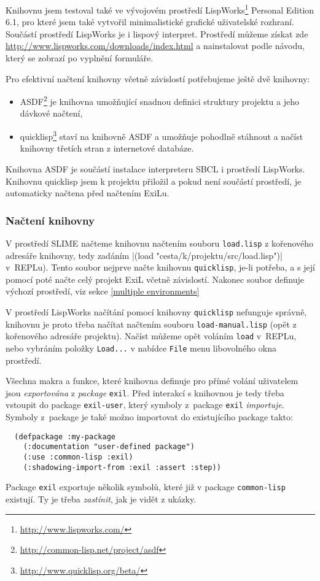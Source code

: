 Knihovnu jsem testoval také ve vývojovém prostředí
LispWorks\registered\footnote{\url{http://www.lispworks.com/}} Personal Edition
6.1, pro které jsem také vytvořil minimalistické grafické uživatelské rozhraní.
Součástí prostředí LispWorks je i lispový interpret. Prostředí můžeme získat zde
\url{http://www.lispworks.com/downloads/index.html} a nainstalovat podle návodu,
který se zobrazí po vyplnění formuláře.

Pro efektivní načtení knihovny včetně závislostí potřebujeme ještě dvě knihovny:
\begin{itemize}
  \item ASDF\footnote{\url{http://common-lisp.net/project/asdf}} je knihovna
    umožňující snadnou definici struktury projektu a jeho dávkové načtení,
  \item quicklisp\footnote{\url{http://www.quicklisp.org/beta/}} staví na knihovně
    ASDF a umožňuje pohodlně stáhnout a načíst knihovny třetích stran z internetové
    databáze.
\end{itemize}
Knihovna ASDF je součástí instalace interpreteru SBCL i prostředí LispWorks.
Knihovnu quicklisp jsem k projektu přiložil a pokud není součástí prostředí, je
automaticky načtena před načtením ExiLu.
\subsubsection{Načtení knihovny}
V prostředí SLIME načteme knihovnu načtením souboru \verb|load.lisp| z kořenového
adresáře knihovny, tedy zadáním \cl|(load "cesta/k/projektu/src/load.lisp")|
v~REPLu). Tento soubor nejprve načte knihovnu \verb|quicklisp|, je-li potřeba,
a s její pomocí poté načte celý projekt ExiL včetně závislostí. Nakonec soubor
definuje výchozí prostředí, viz sekce \ref{multiple environments}

V prostředí LispWorks načítání pomocí knihovny \verb|quicklisp| nefunguje správně,
knihovnu je proto třeba načítat načtením souboru \verb|load-manual.lisp| (opět
z kořenového adresáře projektu). Načíst můžeme opět voláním \verb|load| v~REPLu,
nebo vybráním položky \verb|Load...| v nabídce \verb|File| menu libovolného okna
prostředí.

Všechna makra a funkce, které knihovna definuje pro přímé volání uživatelem jsou
\emph{exportována} z \emph{package} \verb|exil|. Před interakcí s knihovnou je
tedy třeba vstoupit do package \verb|exil-user|, který symboly z~package
\verb|exil| \emph{importuje}. Symboly z~package je také možno importovat do
existujícího package takto:
\begin{verbatim}
  (defpackage :my-package
    (:documentation "user-defined package")
    (:use :common-lisp :exil)
    (:shadowing-import-from :exil :assert :step))
\end{verbatim}
Package \verb|exil| exportuje několik symbolů, které již v package
\verb|common-lisp| existují. Ty je třeba \emph{zastínit}, jak je vidět z ukázky.
